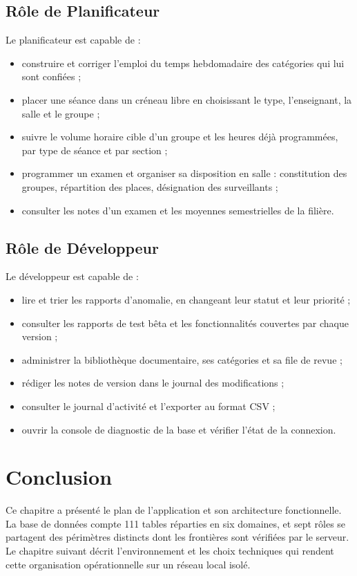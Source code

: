 \subsection{Rôle de Planificateur}
Le planificateur est capable de :
\begin{itemize}
    \item construire et corriger l'emploi du temps hebdomadaire des catégories qui lui sont confiées ;
    \item placer une séance dans un créneau libre en choisissant le type, l'enseignant, la salle et le
          groupe ;
    \item suivre le volume horaire cible d'un groupe et les heures déjà programmées, par type de séance
          et par section ;
    \item programmer un examen et organiser sa disposition en salle : constitution des groupes,
          répartition des places, désignation des surveillants ;
    \item consulter les notes d'un examen et les moyennes semestrielles de la filière.
\end{itemize}

\subsection{Rôle de Développeur}
Le développeur est capable de :
\begin{itemize}
    \item lire et trier les rapports d'anomalie, en changeant leur statut et leur priorité ;
    \item consulter les rapports de test bêta et les fonctionnalités couvertes par chaque version ;
    \item administrer la bibliothèque documentaire, ses catégories et sa file de revue ;
    \item rédiger les notes de version dans le journal des modifications ;
    \item consulter le journal d'activité et l'exporter au format \ac{CSV} ;
    \item ouvrir la console de diagnostic de la base et vérifier l'état de la connexion.
\end{itemize}

\section{Conclusion}
Ce chapitre a présenté le plan de l'application et son architecture fonctionnelle. La base de données
compte 111 tables réparties en six domaines, et sept rôles se partagent des périmètres distincts dont
les frontières sont vérifiées par le serveur. Le chapitre suivant décrit l'environnement et les choix
techniques qui rendent cette organisation opérationnelle sur un réseau local isolé.
